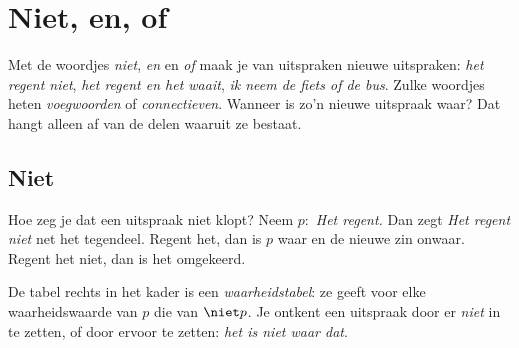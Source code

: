 \begin{oefeningen}
\end{oefeningen}

\section{Niet, en, of}

Met de woordjes \textit{niet}, \textit{en} en \textit{of} maak je van uitspraken nieuwe uitspraken: \textit{het regent niet}, \textit{het regent en het waait}, \textit{ik neem de fiets of de bus}. Zulke woordjes heten \textit{voegwoorden} of \textit{connectieven}. Wanneer is zo'n nieuwe uitspraak waar? Dat hangt alleen af van de delen waaruit ze bestaat.

\subsection{Niet}

Hoe zeg je dat een uitspraak niet klopt? Neem $p$:~\textit{Het regent.} Dan zegt \textit{Het regent niet} net het tegendeel. Regent het, dan is $p$ waar en de nieuwe zin onwaar. Regent het niet, dan is het omgekeerd.

\begin{theorie}
\end{theorie}

De tabel rechts in het kader is een \textit{waarheidstabel}: ze geeft voor elke waarheidswaarde van $p$ die van $\niet p$. Je ontkent een uitspraak door er \textit{niet} in te zetten, of door ervoor te zetten: \textit{het is niet waar dat}.


